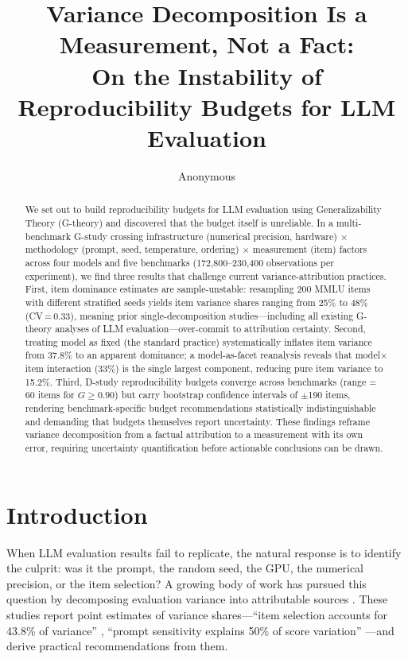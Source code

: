\documentclass[11pt]{article}
\title{Variance Decomposition Is a Measurement, Not a Fact:\\
On the Instability of Reproducibility Budgets for LLM Evaluation}
\author{Anonymous}
\date{}
\begin{document}
\maketitle

\begin{abstract}
We set out to build reproducibility budgets for LLM evaluation using Generalizability Theory (G-theory) and discovered that the budget itself is unreliable.
In a multi-benchmark G-study crossing infrastructure (numerical precision, hardware) $\times$ methodology (prompt, seed, temperature, ordering) $\times$ measurement (item) factors across four models and five benchmarks (172{,}800--230{,}400 observations per experiment), we find three results that challenge current variance-attribution practices.
First, item dominance estimates are sample-unstable: resampling 200 MMLU items with different stratified seeds yields item variance shares ranging from 25\% to 48\% (CV\,=\,0.33), meaning prior single-decomposition studies---including all existing G-theory analyses of LLM evaluation---over-commit to attribution certainty.
Second, treating model as fixed (the standard practice) systematically inflates item variance from 37.8\% to an apparent dominance; a model-as-facet reanalysis reveals that model$\times$item interaction (33\%) is the single largest component, reducing pure item variance to 15.2\%.
Third, D-study reproducibility budgets converge across benchmarks (range = 60 items for $G \geq 0.90$) but carry bootstrap confidence intervals of $\pm$190 items, rendering benchmark-specific budget recommendations statistically indistinguishable and demanding that budgets themselves report uncertainty.
These findings reframe variance decomposition from a factual attribution to a measurement with its own error, requiring uncertainty quantification before actionable conclusions can be drawn.
\end{abstract}

\section{Introduction}

When LLM evaluation results fail to replicate, the natural response is to identify the culprit: was it the prompt, the random seed, the GPU, the numerical precision, or the item selection?
A growing body of work has pursued this question by decomposing evaluation variance into attributable sources \citep{bouthillier2021accounting, mesting2026generalizability, brittlebench2026}.
These studies report point estimates of variance shares---``item selection accounts for 43.8\% of variance'' \citep{mesting2026generalizability}, ``prompt sensitivity explains 50\% of score variation'' \citep{brittlebench2026}---and derive practical recommendations from them.
\end{document}
